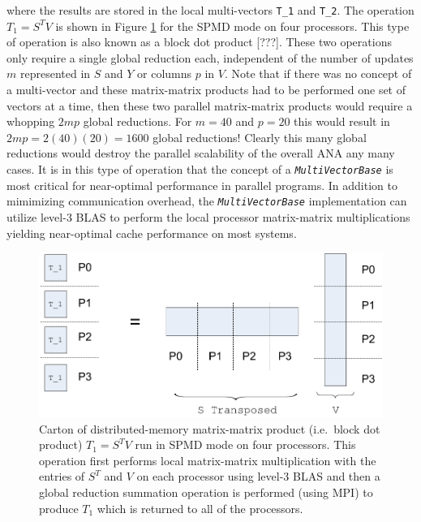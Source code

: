 \documentclass[pdf,ps2pdf,11pt]{SANDreport}
\begin{document}
{}\noindent{}where the results are stored in the local multi-vectors
{}\texttt{T\_1} and {}\texttt{T\_2}.  The operation $T_1 = S^T V$ is
shown in Figure {}\ref{tsfcore:fig:SPMD_Block_Dot_Prod_P4} for the
SPMD mode on four processors.  This type of operation is also known as
a block dot product [???].  These two operations only require a single
global reduction each, independent of the number of updates $m$
represented in $S$ and $Y$ or columns $p$ in $V$.  Note that if there
was no concept of a multi-vector and these matrix-matrix products had
to be performed one set of vectors at a time, then these two parallel
matrix-matrix products would require a whopping $2 m p$ global
reductions.  For $m = 40$ and $p = 20$ this would result in $2 m p =
2(40)(20) = 1600$ global reductions!  Clearly this many global
reductions would destroy the parallel scalability of the overall ANA
any many cases.  It is in this type of operation that the concept of a
{}\texttt{\textit{Multi\-Vector\-Base}} is most critical for near-optimal
performance in parallel programs.  In addition to mimimizing
communication overhead, the {}\texttt{\textit{Multi\-Vector\-Base}}
implementation can utilize level-3 BLAS to perform the local processor
matrix-matrix multiplications yielding near-optimal cache performance
on most systems.

{\bsinglespace
\begin{figure}
\begin{center}
\includegraphics*[angle=0,scale=0.60]{figures/SPMD_Block_Dot_Prod_P4}
\end{center}
\caption{
\label{tsfcore:fig:SPMD_Block_Dot_Prod_P4}
Carton of distributed-memory matrix-matrix product (i.e.~block dot
product) $T_1 = S^T V$ run in SPMD mode on four processors.  This
operation first performs local matrix-matrix multiplication with the
entries of $S^T$ and $V$ on each processor using level-3 BLAS and then
a global reduction summation operation is performed (using MPI) to
produce $T_1$ which is returned to all of the processors.}
\end{figure}
\esinglespace}
\end{document}
